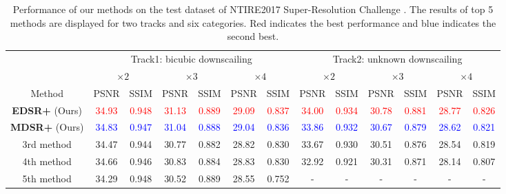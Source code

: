 \documentclass[10pt,twocolumn,letterpaper]{article}
\begin{document}
	\begin{table*}[h]
		{\footnotesize
			\setlength\tabcolsep{8pt}
			\renewcommand{\arraystretch}{1.3}
			\begin{center}
				\begin{tabular}{c*{6}{c}*{6}{c}}
					\hline
					& \multicolumn{6}{c}{Track1: bicubic downscailing} 
					& \multicolumn{6}{c}{Track2: unknown downscailing} \\
					& \multicolumn{2}{c}{$\times 2$}
					& \multicolumn{2}{c}{$\times 3$} 
					& \multicolumn{2}{c}{$\times 4$} 
					& \multicolumn{2}{c}{$\times 2$} 
					& \multicolumn{2}{c}{$\times 3$} 
					& \multicolumn{2}{c}{$\times 4$} \\
					Method &
					PSNR & SSIM & PSNR & SSIM & PSNR & SSIM & PSNR & SSIM &	PSNR & SSIM & PSNR & SSIM \\
					\hline
					\textbf{EDSR+} (Ours) &
					\textcolor{red}{34.93} & \textcolor{red}{0.948} &
					\textcolor{red}{31.13} & \textcolor{red}{0.889} &
					\textcolor{red}{29.09} & \textcolor{red}{0.837} &
					\textcolor{red}{34.00} & \textcolor{red}{0.934} &
					\textcolor{red}{30.78} & \textcolor{red}{0.881} &
					\textcolor{red}{28.77} & \textcolor{red}{0.826} \\
					\textbf{MDSR+} (Ours) &
					\textcolor{blue}{34.83} & \textcolor{blue}{0.947} &
					\textcolor{blue}{31.04} & \textcolor{blue}{0.888} &
					\textcolor{blue}{29.04} & \textcolor{blue}{0.836} &
					\textcolor{blue}{33.86} & \textcolor{blue}{0.932} &
					\textcolor{blue}{30.67} & \textcolor{blue}{0.879} &
					\textcolor{blue}{28.62} & \textcolor{blue}{0.821} \\
					3rd method &
					{34.47} & {0.944} &
					{30.77} & {0.882} &
					{28.82} & {0.830} &
					{33.67} & {0.930} &
					{30.51} & {0.876} &
					{28.54} & {0.819} \\
					4th method &
					{34.66} & {0.946} &
					{30.83} & {0.884} &
					{28.83} & {0.830} &
					{32.92} & {0.921} &
					{30.31} & {0.871} &
					{28.14} & {0.807} \\
					5th method &
					{34.29} & {0.948} &
					{30.52} & {0.889} &
					{28.55} & {0.752} &
					{-} & {-} &
					{-} & {-} &
					{-} & {-} \\
					\hline
				\end{tabular}
			\end{center}
		}
		\captionsetup{justification=raggedright,singlelinecheck=false}
		\caption{Performance of our methods on the test dataset of NTIRE2017 Super-Resolution Challenge  \cite{Timofte_2017_CVPR_Workshops}. The results of top 5 methods are displayed for two tracks and six categories. Red indicates the best performance and blue indicates the second best. 
		}
		\label{table_ntire_result}
	\end{table*}
	
\end{document}
